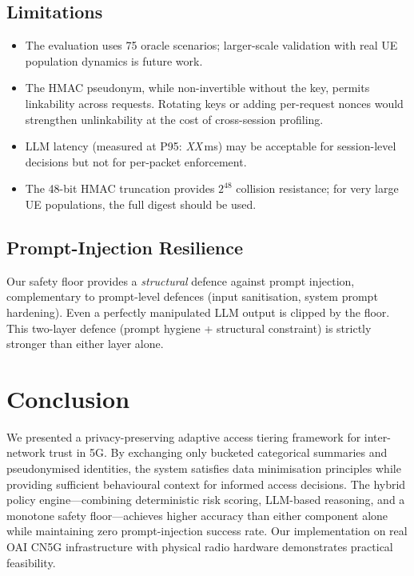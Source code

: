 \documentclass[conference]{IEEEtran}
\begin{document}
\subsection{Limitations}
\begin{itemize}
    \item The evaluation uses 75 oracle scenarios; larger-scale validation with real UE population dynamics is future work.
    \item The HMAC pseudonym, while non-invertible without the key, permits linkability across requests. Rotating keys or adding per-request nonces would strengthen unlinkability at the cost of cross-session profiling.
    \item LLM latency (measured at P95: \textit{XX}\,ms) may be acceptable for session-level decisions but not for per-packet enforcement.
    \item The 48-bit HMAC truncation provides $2^{48}$ collision resistance; for very large UE populations, the full digest should be used.
\end{itemize}

\subsection{Prompt-Injection Resilience}
Our safety floor provides a \emph{structural} defence against prompt injection, complementary to prompt-level defences (input sanitisation, system prompt hardening). Even a perfectly manipulated LLM output is clipped by the floor. This two-layer defence (prompt hygiene + structural constraint) is strictly stronger than either layer alone.

\section{Conclusion}
\label{sec:conclusion}

We presented a privacy-preserving adaptive access tiering framework for inter-network trust in 5G. By exchanging only bucketed categorical summaries and pseudonymised identities, the system satisfies data minimisation principles while providing sufficient behavioural context for informed access decisions. The hybrid policy engine---combining deterministic risk scoring, LLM-based reasoning, and a monotone safety floor---achieves higher accuracy than either component alone while maintaining zero prompt-injection success rate. Our implementation on real OAI CN5G infrastructure with physical radio hardware demonstrates practical feasibility.
\end{document}
